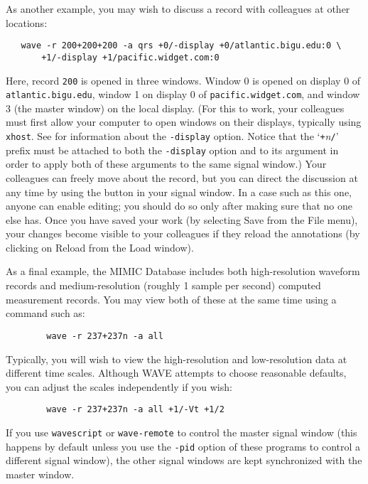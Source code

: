 \documentclass[twoside]{book}
\newcommand{\button}[1]{\cornersize{2}\ovalbox{\rule[-.3mm]{0cm}{2.5mm}\small\sf ~#1~}}
\newcommand{\WAVE}{{\sf WAVE}\xspace}
\begin{document}
As another example, you may wish to discuss a record with colleagues
at other locations:
\begin{verbatim}
   wave -r 200+200+200 -a qrs +0/-display +0/atlantic.bigu.edu:0 \
       +1/-display +1/pacific.widget.com:0
\end{verbatim}
Here, record {\tt 200} is opened in three windows.  Window 0 is opened on
display 0 of {\tt atlantic.bigu.edu}, window 1 on display 0 of
{\tt pacific.widget.com}, and window 3 (the master window) on the local
display.  (For this to work, your colleagues must first allow your
computer to open windows on their displays, typically using
{\tt xhost}.  See
for information about the {\tt -display} option.  Notice that the
`{\tt +}{\it n}{\tt /}' prefix must be attached to
both the {\tt -display} option and to its argument in order to
apply both of these arguments to the same signal window.)
Your colleagues can freely move about the record, but you can direct
the discussion at any time by using the \button{Sync} button in your signal
window.  In a case such as this one, anyone can enable editing; you
should do so only after making sure that no one else has.  Once you
have saved your work (by selecting {\sf Save} from the {\sf File} menu), your
changes become visible to your colleagues if they reload the
annotations (by clicking on {\sf Reload} from the {\sf Load} window).

As a final example, the MIMIC Database includes both high-resolution
waveform records and medium-resolution (roughly 1 sample per second)
computed measurement records.  You may view both of these at the same
time using a command such as:
\begin{verbatim}
        wave -r 237+237n -a all
\end{verbatim}
Typically, you will wish to view the high-resolution and low-resolution
data at different time scales.  Although \WAVE{} attempts to choose
reasonable defaults, you can adjust the scales independently if you wish:
\begin{verbatim}
        wave -r 237+237n -a all +1/-Vt +1/2
\end{verbatim}

If you use {\tt wavescript} or {\tt wave-remote} to control the master
signal window (this happens by default unless you use the {\tt -pid} option
of these programs to control a different signal window), the other signal
windows are kept synchronized with the master window.
\end{document}
